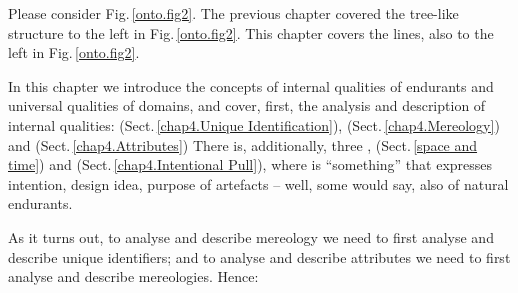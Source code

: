 




\label{chap4.tex.1}
\pos{\minitoc}{}

\vspace*{2mm}

\noindent
\begynd
\pind Please consider Fig.\,\vref{onto.fig2}.
\begynd
\pind The previous chapter covered the tree-like structure to the left in  Fig.\,\ref{onto.fig2}.
\pind This chapter covers the  lines, also
      to the left\ysf{,} in Fig.\,\ref{onto.fig2}.
\afslut
\afslut

\treprikker

\mnewfoil

\HHHH
\noindent 
\begynd
\pind In this chapter we introduce 
\begynd 
\pind the concepts of internal qualities of endurants and  universal
      qualities of domains, 
\pind and cover, first, the analysis and description of internal qualities:
\LLLL\HHHH
\begynd
\pind {} (Sect.\,\vref{chap4.Unique Identification}),
\pind {} (Sect.\,\vref{chap4.Mereology}) and
\pind {} (Sect.\,\vref{chap4.Attributes})
\afslut
\mnewfoil
\pind There is, additionally, three 
\begynd
\pind {},  (Sect.\,\vref{space and time}) and
\pind {} (Sect.\,\vref{chap4.Intentional Pull}), where
\begynd
\pind {} is  ``something'' that expresses
\pind intention, design idea, purpose of artefacts -- 
\pind well, some would say, also of natural endurants.
\afslut
\afslut
\afslut

\mnewfoil

\pind As it turns out, 
\begynd
\pind to analyse and describe mereology
\pind we need to first analyse and describe unique identifiers;
\afslut
and
\begynd
\pind to analyse and describe attributes
\pind we need to first analyse and describe mereologies.
\afslut
\mnewfoil
\pind Hence:
\afslut

